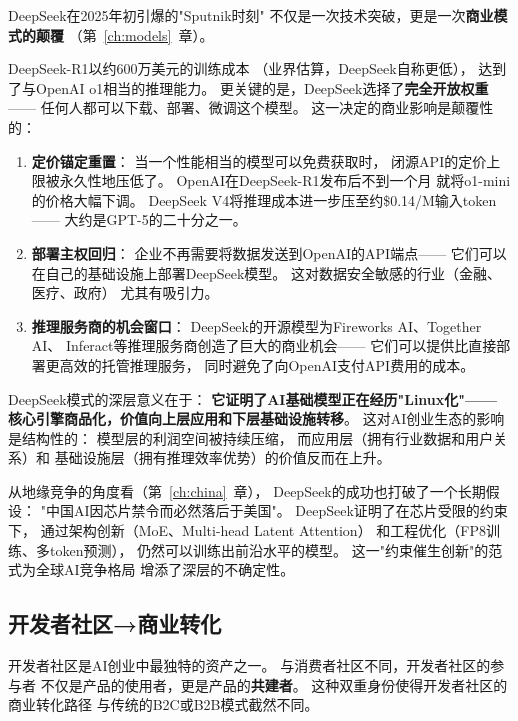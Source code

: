 DeepSeek在2025年初引爆的"Sputnik时刻"
不仅是一次技术突破，更是一次\textbf{商业模式的颠覆}
（第~\ref{ch:models}~章）。

DeepSeek-R1以约600万美元的训练成本
（业界估算，DeepSeek自称更低），
达到了与OpenAI o1相当的推理能力。
更关键的是，DeepSeek选择了\textbf{完全开放权重}——
任何人都可以下载、部署、微调这个模型。
这一决定的商业影响是颠覆性的：

\begin{enumerate}
  \item \textbf{定价锚定重置}：
    当一个性能相当的模型可以免费获取时，
    闭源API的定价上限被永久性地压低了。
    OpenAI在DeepSeek-R1发布后不到一个月
    就将o1-mini的价格大幅下调。
    DeepSeek V4将推理成本进一步压至约\$0.14/M输入token——
    大约是GPT-5的二十分之一。

  \item \textbf{部署主权回归}：
    企业不再需要将数据发送到OpenAI的API端点——
    它们可以在自己的基础设施上部署DeepSeek模型。
    这对数据安全敏感的行业（金融、医疗、政府）
    尤其有吸引力。

  \item \textbf{推理服务商的机会窗口}：
    DeepSeek的开源模型为Fireworks AI、Together AI、
    Inferact等推理服务商创造了巨大的商业机会——
    它们可以提供比直接部署更高效的托管推理服务，
    同时避免了向OpenAI支付API费用的成本。
\end{enumerate}

DeepSeek模式的深层意义在于：
\textbf{它证明了AI基础模型正在经历"Linux化"——
核心引擎商品化，价值向上层应用和下层基础设施转移}。
这对AI创业生态的影响是结构性的：
模型层的利润空间被持续压缩，
而应用层（拥有行业数据和用户关系）和
基础设施层（拥有推理效率优势）的价值反而在上升。

从地缘竞争的角度看（第~\ref{ch:china}~章），
DeepSeek的成功也打破了一个长期假设：
"中国AI因芯片禁令而必然落后于美国"。
DeepSeek证明了在芯片受限的约束下，
通过架构创新（MoE、Multi-head Latent Attention）
和工程优化（FP8训练、多token预测），
仍然可以训练出前沿水平的模型。
这一"约束催生创新"的范式为全球AI竞争格局
增添了深层的不确定性。


\subsection{开发者社区→商业转化}

开发者社区是AI创业中最独特的资产之一。
与消费者社区不同，开发者社区的参与者
不仅是产品的使用者，更是产品的\textbf{共建者}。
这种双重身份使得开发者社区的商业转化路径
与传统的B2C或B2B模式截然不同。

